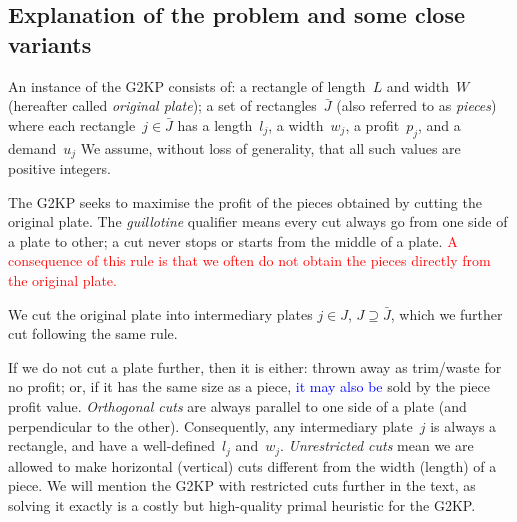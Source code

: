 \documentclass[smallextended]{svjour3}       %
\newif\iffinalversion
\newcommand{\newtext}[1]{\iffinalversion%
#1%
\else%
\textcolor{blue}{#1}%
\fi%
}
\newcommand{\oldtext}[1]{\iffinalversion%
#1%
\else%
\textcolor{red}{#1}%
\fi%
}
\begin{document}
\subsection{Explanation of the problem and some close variants}

An instance of the G2KP consists of: a rectangle of length~\(L\) and width~\(W\) (hereafter called \emph{original plate}); a set of rectangles~\(\bar{J}\) (also referred to as \emph{pieces}) where each rectangle~\(j \in \bar{J}\) has a length~\(l_j\), a width~\(w_j\), a profit~\(p_j\), and a demand~\(u_j\)
We assume, without loss of generality, that all such values are positive integers.

The G2KP seeks to maximise the profit of the pieces obtained by cutting the original plate.
The \emph{guillotine} qualifier means every cut always go from one side of a plate to other; a cut never stops or starts from the middle of a plate.
\oldtext{A consequence of this rule is that we often do not obtain the pieces directly from the original plate.}
We cut the original plate into intermediary plates \(j \in J\), \(J \supseteq \bar{J}\), which we further cut following the same rule.

If we do not cut a plate further, then it is either: thrown away as trim/waste for no profit; or, if it has the same size as a piece, \newtext{it may also be} sold by the piece profit value.
\emph{Orthogonal cuts} are always parallel to one side of a plate (and perpendicular to the other).
Consequently, any intermediary plate~\(j\) is always a rectangle, and have a well-defined~\(l_j\) and~\(w_j\).
\emph{Unrestricted cuts} mean we are allowed to make horizontal (vertical) cuts different from the width (length) of a piece.
We will mention the G2KP with restricted cuts further in the text, as solving it exactly is a costly but high-quality primal heuristic for the G2KP.
\end{document}
